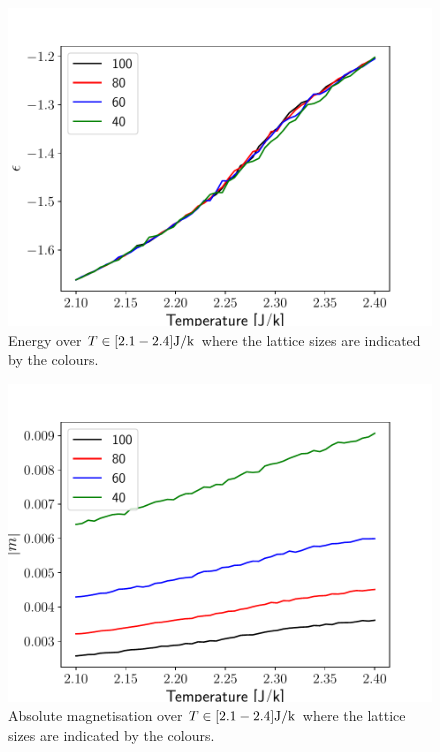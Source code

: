 \documentclass[english,notitlepage,reprint,nofootinbib]{revtex4-2}  %
\begin{document}
	\begin{figure}[h!]
	  \centering
	  \includegraphics[width=1.0\linewidth]{figures/prob8_eps.pdf}
	  \caption{Energy over $T\in [2.1-2.4] \rm{ J}/k$ where the lattice sizes are indicated by the colours.\label{fig:prob8_eps}}
	\end{figure}

	\begin{figure}[h!]
	  \centering
	  \includegraphics[width=1.0\linewidth]{figures/prob8_m.pdf}
	  \caption{Absolute magnetisation over $T\in [2.1-2.4] \rm{ J}/k$ where the lattice sizes are indicated by the colours.\label{fig:prob8_m} }
	\end{figure}
\end{document}
